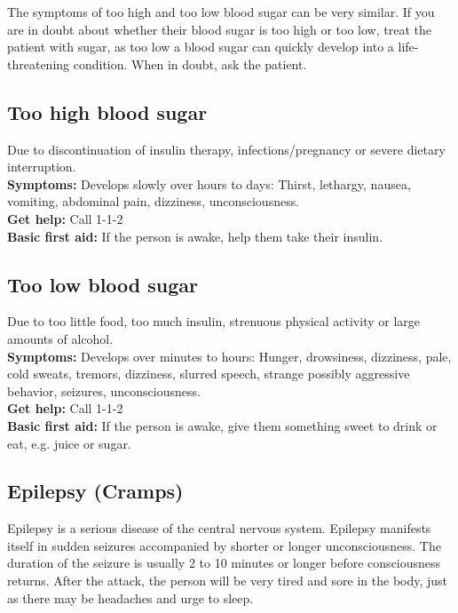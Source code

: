 \documentclass[../../../main.tex]{subfiles}
\begin{document}
\begin{multicols}{2}
\textbf{}The symptoms of too high and too low blood sugar can be very similar. If you are in doubt about whether their blood sugar is too high or too low, treat the patient with sugar, as too low a blood sugar can quickly develop into a life-threatening condition. When in doubt, ask the patient.
\\

\subsection*{Too high blood sugar} Due to discontinuation of insulin therapy, infections/pregnancy or severe dietary interruption.
\\

\textbf{Symptoms:} Develops slowly over hours to days: Thirst, lethargy, nausea, vomiting, abdominal pain, dizziness, unconsciousness.
\\

\textbf{Get help:} Call 1-1-2
\\

\textbf{Basic first aid:} If the person is awake, help them take their insulin.\\

\subsection*{Too low blood sugar} Due to too little food, too much insulin, strenuous physical activity or large amounts of alcohol.
\\

\textbf{Symptoms:} Develops over minutes to hours: Hunger, drowsiness, dizziness, pale, cold sweats, tremors, dizziness, slurred speech, strange possibly aggressive behavior, seizures, unconsciousness.
\\

\textbf{Get help:} Call 1-1-2
\\

\textbf{Basic first aid:} If the person is awake, give them something sweet to drink or eat, e.g. juice or sugar.
\\

\subsection*{Epilepsy (Cramps)} Epilepsy is a serious disease of the central nervous system. Epilepsy manifests itself in sudden seizures accompanied by shorter or longer unconsciousness. The duration of the seizure is usually 2 to 10 minutes or longer before consciousness returns. After the attack, the person will be very tired and sore in the body, just as there may be headaches and urge to sleep.
\\


\end{multicols}
\end{document}
